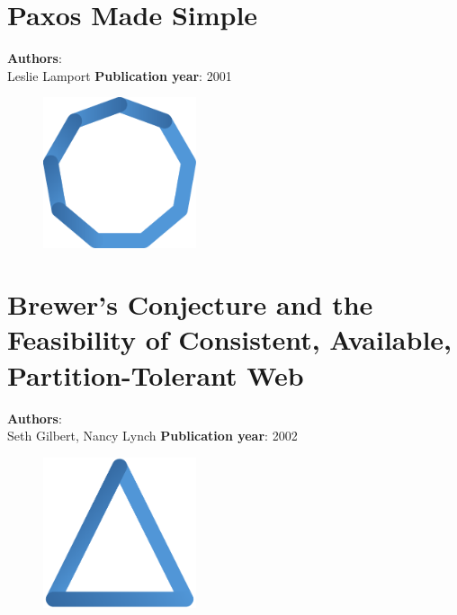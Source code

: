 \documentclass[11pt,fleqn]{book} %
\begin{document}
\chapter{Paxos Made Simple}
\vspace*{-7mm}
\Large \textbf{Authors}: \\
Leslie Lamport
\newline\newline
\textbf{Publication year}: 2001
\begin{figure}[b]
    \centering
    \includegraphics[width=0.4\textwidth]{distributed-systems-blue.pdf}
\end{figure}


\chapter{Brewer’s Conjecture and the Feasibility of Consistent, Available, Partition-Tolerant Web}
\vspace*{-7mm}
\Large \textbf{Authors}: \\
Seth Gilbert, Nancy Lynch
\newline\newline
\textbf{Publication year}: 2002
\begin{figure}[b]
    \centering
    \includegraphics[width=0.4\textwidth]{distributed-systems-triangle-blue.pdf}
\end{figure}

\end{document}
